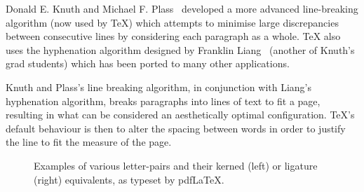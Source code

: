 Donald E. Knuth and Michael F. Plass~\cite{Knuth1981} developed a more advanced line-breaking algorithm (now used by \TeX{}) which attempts to minimise large discrepancies between consecutive lines by considering each paragraph as a whole. \TeX{} also uses the hyphenation algorithm designed by Franklin Liang~\cite{Liang1983} (another of Knuth's grad students) which has been ported to many other applications.

Knuth and Plass's line breaking algorithm, in conjunction with Liang's hyphenation algorithm, breaks paragraphs into lines of text to fit a page, resulting in what can be considered an aesthetically optimal configuration. \TeX 's default behaviour is then to alter the spacing between words in order to justify the line to fit the measure of the page.

\begin{figure}
 \caption{Examples of various letter-pairs and their kerned (left) or ligature (right) equivalents, as typeset by pdf\LaTeX{}.}
 \label{fig:kern-lig}
\end{figure}

